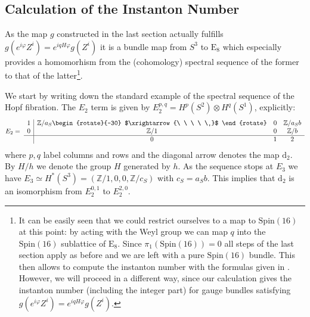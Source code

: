 \documentclass[a4paper,12pt,twoside]{article}
\numberwithin{equation}{section}
\let\phi\varphi
\newcommand{\Spin}{\text{Spin}} %
\newcommand{\pE}{\text{E}  }     %
\newcommand{\mZ}{\mathbb{Z}}
\newcommand{\Dd}{\text{d}}      %
\begin{document}
\subsection{Calculation of the Instanton Number}
\label{INos}

\newcommand{\dt}{\begin{rotate}{-30} $\xrightarrow{\ \ \ \ \ }$ \end{rotate}}


As the map $g$ constructed in the last section actually fulfills
$g(e^{i\phi}Z^i)= e^{iqH\phi} g(Z^i)$ it is a bundle map from $S^3$ to
$\pE_8$ which especially provides a homomorhism from the (cohomology)
spectral sequence of the former to that of the latter\footnote{It can
  be easily seen that we could restrict ourselves to a map to
  $\Spin(16)$ at this point: by acting with the Weyl group we can map
  $q$ into the $\Spin(16)$ sublattice of $\pE_8$. Since
  $\pi_1(\Spin(16))=0$ all steps of the last section apply as before
  and we are left with a pure $\Spin(16)$ bundle. This then allows to
  compute the instanton number with the formulas given in
  \cite{Intriligator, Aldazabal}. However, we will proceed in a
  different way, since our calculation gives the instanton number
  (including the integer part) for gauge bundles satisfying
  $g(e^{i\phi}Z^i)= e^{iqH\phi} g(Z^i)$.  }.

We start by writing down the standard example of the spectral sequence
of the Hopf fibration. The $E_2$ term is given by $E_2^{p,q} = H^p
(S^2) \otimes H^q (S^1)$, explicitly:
\begin{equation}
  \label{eq:E2S}
  E_2 = \;
  \begin{array}{c|ccc}
    1 & \mZ/a_S \dt & 0 & \mZ/a_Sb \\
    0 & \mZ/1       & 0 & \mZ/b \\
    \hline
      &  0          & 1 & 2 \\
  \end{array}
\end{equation}
where $p,q$ label columns and rows and the diagonal arrow denotes the
map $\Dd_2$. By $H/h$ we denote the group $H$ generated by $h$. As the
sequence stops at $E_3$ we have $E_3 \simeq H^*(S^3) = (\mZ/1, 0, 0,
\mZ/c_S)$ with $c_S = a_S b$. This implies that $\Dd_2$ is an
isomorphism from $E_2^{0,1}$ to $E_2^{2,0}$.
\end{document}
